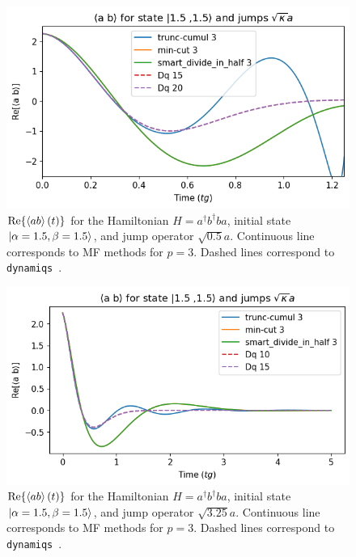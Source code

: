 \begin{center}
    \begin{figure}[h!]
      \centering
      \includegraphics[width=0.9\linewidth]{Pics/Eg_H_CrossKerr_1Loss.pdf}
      \caption{$\Re{\left\langle a b \right\rangle(t)}$ for the Hamiltonian $H = a^\dagger b^\dagger b a$, initial state $\ket{\alpha = 1.5, \beta = 1.5}$, and jump operator $\sqrt{0.5} a$. Continuous line corresponds to MF methods for $p=3$. Dashed lines correspond to \texttt{dynamiqs}~\cite{dynamiqs}.}
      \label{fig:Eg_H_CrossKerr_1Loss}
    \end{figure}
\end{center}

\begin{center}
    \begin{figure}[h!]
      \centering
      \includegraphics[width=0.9\linewidth]{Pics/Eg_H_CrossKerr_1Loss_stable.pdf}
      \caption{$\Re{\left\langle a b \right\rangle(t)}$ for the Hamiltonian $H = a^\dagger b^\dagger b a$, initial state $\ket{\alpha = 1.5, \beta = 1.5}$, and jump operator $\sqrt{3.25} a$. Continuous line corresponds to MF methods for $p=3$. Dashed lines correspond to \texttt{dynamiqs}~\cite{dynamiqs}.}
      \label{fig:Eg_H_CrossKerr_1Loss_stable}
    \end{figure}
\end{center}

